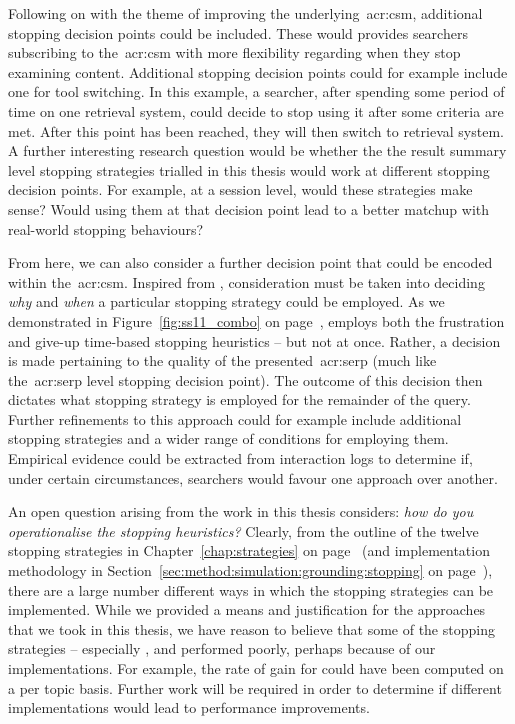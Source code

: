 Following on with the theme of improving the underlying~\gls{acr:csm}, additional stopping decision points could be included. These would provides searchers subscribing to the~\gls{acr:csm} with more flexibility regarding when they stop examining content. Additional stopping decision points could for example include one for tool switching. In this example, a searcher, after spending some period of time on one retrieval system, could decide to stop using it after some criteria are met. After this point has been reached, they will then switch to retrieval system. A further interesting research question would be whether the the result summary level stopping strategies trialled in this thesis would work at different stopping decision points. For example, at a session level, would these strategies make sense? Would using them at that decision point lead to a better matchup with real-world stopping behaviours?

From here, we can also consider a further decision point that could be encoded within the~\gls{acr:csm}. Inspired from , consideration must be taken into deciding \emph{why} and \emph{when} a particular stopping strategy could be employed. As we demonstrated in Figure~\ref{fig:ss11_combo} on page~\pageref{fig:ss11_combo},  employs both the frustration and give-up time-based stopping heuristics -- but not at once. Rather, a decision is made pertaining to the quality of the presented~\gls{acr:serp} (much like the~\gls{acr:serp} level stopping decision point). The outcome of this decision then dictates what stopping strategy is employed for the remainder of the query. Further refinements to this approach could for example include additional stopping strategies and a wider range of conditions for employing them. Empirical evidence could be extracted from interaction logs to determine if, under certain circumstances, searchers would favour one approach over another.

An open question arising from the work in this thesis considers: \emph{how do you operationalise the stopping heuristics?} Clearly, from the outline of the twelve stopping strategies in Chapter~\ref{chap:strategies} on page~\pageref{chap:strategies} (and implementation methodology in Section~\ref{sec:method:simulation:grounding:stopping} on page~\pageref{sec:method:simulation:grounding:stopping}), there are a large number different ways in which the stopping strategies can be implemented. While we provided a means and justification for the approaches that we took in this thesis, we have reason to believe that some of the stopping strategies -- especially ,  and  performed poorly, perhaps because of our implementations. For example, the rate of gain for  could have been computed on a per topic basis. Further work will be required in order to determine if different implementations would lead to performance improvements.

